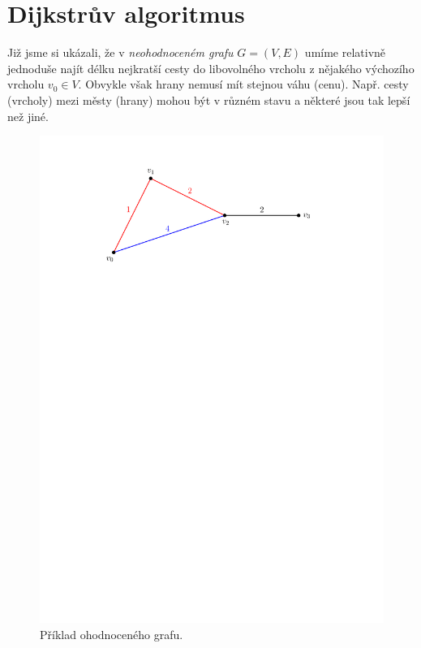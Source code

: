 \section{Dijkstrův algoritmus}\label{sec:dijkstra}

Již jsme si ukázali, že v \emph{neohodnoceném grafu} $G=(V,E)$ umíme relativně jednoduše najít délku nejkratší cesty do libovolného vrcholu z nějakého výchozího vrcholu $v_0\in V$. Obvykle však hrany nemusí mít stejnou váhu (cenu). Např. cesty (vrcholy) mezi městy (hrany) mohou být v různém stavu a některé jsou tak lepší než jiné.
\begin{figure}[h]
    \centering
    \includegraphics[scale=\graphimgsize]{01-grafalgo/images/ch01_ohod_graf.pdf}
    \caption{Příklad ohodnoceného grafu.}
    \label{fig:ohod_graf}
\end{figure}
